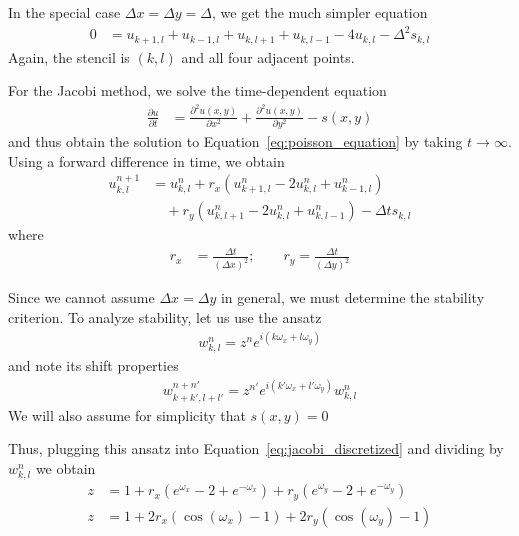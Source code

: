 \documentclass[twocolumn]{myarticle}
\numberwithin{equation}{section}
\begin{document}
In the special case $ \Delta x = \Delta y = \Delta $, we get the much simpler equation
\begin{align}
    0 &= u_{k+1, l} + u_{k-1,l} + u_{k,l+1} + u_{k,l-1} - 4 u_{k,l} - \Delta^2 s_{k,l} \label{eq:poisson_discretized}
\end{align}
Again, the stencil is $ (k,l) $ and all four adjacent points.

For the Jacobi method, we solve the time-dependent equation
\begin{align}
    \frac{\partial u}{\partial t} &= \frac{\partial^2 u(x,y)}{\partial x^2} + \frac{\partial^2 u(x,y)}{\partial y^2} - s(x,y)
\end{align}
and thus obtain the solution to Equation~\ref{eq:poisson_equation} by taking $ t \to \infty $.
Using a forward difference in time, we obtain
\begin{align}
    u^{n+1}_{k,l} &= u^n_{k,l} + r_x \left( u^n_{k+1, l} - 2 u^n_{k,l} + u^n_{k-1,l} \right) \nonumber 
    \\
    & \quad + r_y \left( u^n_{k,l+1} - 2 u^n_{k,l} + u^n_{k,l-1} \right) - \Delta t s_{k,l}  \label{eq:jacobi_discretized}
\end{align}
where
\begin{align}
    r_x &= \frac{\Delta t}{\left( \Delta x \right)^2}; \qquad r_y = \frac{\Delta t}{\left( \Delta y \right)^2}
\end{align}

Since we cannot assume $ \Delta x = \Delta y $ in general, we must determine the stability criterion.
To analyze stability, let us use the ansatz 
\begin{align}
    w^n_{k,l} = z^n e^{i \left( k \omega_x + l \omega_y \right)}
\end{align}
and note its shift properties
\begin{align}
    w^{n+n'}_{k+k',l+l'} = z^{n'} e^{i \left( k' \omega_x + l' \omega_y \right)} w^n_{k,l}
\end{align}
We will also assume for simplicity that $ s(x,y) = 0 $

Thus, plugging this ansatz into Equation~\ref{eq:jacobi_discretized} and dividing by $ w^n_{k,l} $ we obtain
\begin{align}
    z &= 1 + r_x \left( e^{\omega_x} - 2 + e^{-\omega_x} \right) + r_y \left( e^{\omega_y} - 2 + e^{-\omega_y} \right)
    \\
    z &= 1 + 2 r_x \left( \cos \left( \omega_x \right) - 1 \right) + 2 r_y \left( \cos \left( \omega_y \right) - 1 \right)
\end{align}
\end{document}
